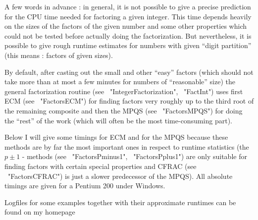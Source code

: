 


A few words in advance : in general, it is not possible to give a precise
prediction for the CPU time needed for factoring a given integer.
This time depends heavily on the sizes of the factors of the given number
and some other properties which could not be tested before actually
doing the factorization.
But nevertheless, it is possible to give rough runtime estimates for
numbers with given ``digit partition'' (this means : factors of given
sizes).

By default, after casting out the small and other ``easy'' factors
(which should not take more than at most a few minutes for numbers of
``reasonable'' size) the general factorization routine 
(see ~"IntegerFactorization", ~"FactInt") uses first ECM
(see ~"FactorsECM") for finding factors very roughly up to the third root
of the remaining composite and then the MPQS (see ~"FactorsMPQS")
for doing the ``rest'' of the work (which will often be the most
time-consuming part).

Below I will give some timings for ECM and for the MPQS because
these methods are by far the most important ones in respect to
runtime statistics (the $p \pm 1$ - methods (see ~"FactorsPminus1",
~"FactorsPplus1") are only suitable for finding factors with certain
special properties and CFRAC (see ~"FactorsCFRAC") is just a slower
predecessor of the MPQS). All absolute timings are given for a
Pentium 200 under Windows.

Logfiles for some examples together with their approximate runtimes
can be found on my homepage 


